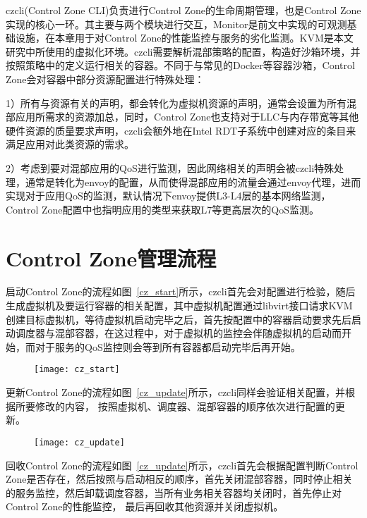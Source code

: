 czcli(Control Zone CLI)负责进行Control Zone的生命周期管理，也是Control Zone实现的核心一环。其主要与两个模块进行交互，Monitor是前文中实现的可观测基础设施，在本章用于对Control Zone的性能监控与服务的劣化监测。KVM是本文研究中所使用的虚拟化环境。czcli需要解析混部策略的配置，构造好沙箱环境，并按照策略中的定义运行相关的容器。不同于与常见的Docker等容器沙箱，Control Zone会对容器中部分资源配置进行特殊处理：

1）所有与资源有关的声明，都会转化为虚拟机资源的声明，通常会设置为所有混部应用所需求的资源加总，同时，Control Zone也支持对于LLC与内存带宽等其他硬件资源的质量要求声明，czcli会额外地在Intel RDT子系统中创建对应的条目来满足应用对此类资源的需求。

2）考虑到要对混部应用的QoS进行监测，因此网络相关的声明会被czcli特殊处理，通常是转化为envoy的配置，从而使得混部应用的流量会通过envoy代理，进而实现对于应用QoS的监测，默认情况下envoy提供L3-L4层的基本网络监测，Control Zone配置中也指明应用的类型来获取L7等更高层次的QoS监测。

\section{Control Zone管理流程}

启动Control Zone的流程如图~\ref{cz_start}所示，czcli首先会对配置进行检验，随后生成虚拟机及要运行容器的相关配置，其中虚拟机配置通过libvirt接口请求KVM创建目标虚拟机，等待虚拟机启动完毕之后，首先按配置中的容器启动要求先后启动调度器与混部容器，在这过程中，对于虚拟机的监控会伴随虚拟机的启动而开始，而对于服务的QoS监控则会等到所有容器都启动完毕后再开始。

\begin{figure}[!htbp]
    \centering
    \texttt{[image: cz\_start]}
    \label{fig:cz_start}
\end{figure}

更新Control Zone的流程如图~\ref{cz_update}所示，czcli同样会验证相关配置，并根据所要修改的内容， 按照虚拟机、调度器、混部容器的顺序依次进行配置的更新。

\begin{figure}[!htbp]
    \centering
    \texttt{[image: cz\_update]}
    \label{fig:cz_update}
\end{figure}

回收Control Zone的流程如图~\ref{cz_update}所示，czcli首先会根据配置判断Control Zone是否存在，然后按照与启动相反的顺序，首先关闭混部容器，同时停止相关的服务监控，然后卸载调度容器，当所有业务相关容器均关闭时，首先停止对Control Zone的性能监控， 最后再回收其他资源并关闭虚拟机。

